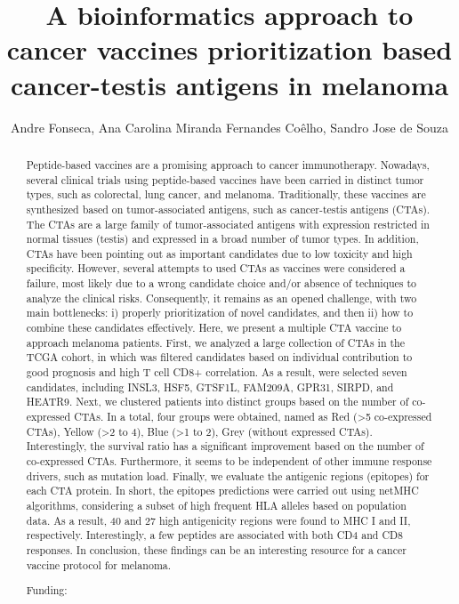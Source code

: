 \documentclass[twoside]{article}
\title{\vspace{-15mm}\fontsize{24pt}{10pt}\selectfont\textbf{ A bioinformatics approach to cancer vaccines prioritization based cancer-testis antigens in melanoma }} %
\author{ Andre Fonseca, Ana Carolina Miranda Fernandes Co\^elho, Sandro Jose de Souza }
\affil{ USP }
\date{}
\begin{document}
  
  
  \maketitle %
  
  
  \thispagestyle{fancy} %
  
  
  \begin{abstract}
  Peptide-based vaccines are a promising approach to cancer immunotherapy. Nowadays,  several clinical trials using peptide-based vaccines have been carried in distinct tumor types,  such as colorectal,  lung cancer,  and melanoma. Traditionally,  these vaccines are synthesized based on tumor-associated antigens,  such as cancer-testis antigens (CTAs). The CTAs are a large family of tumor-associated antigens with expression restricted in normal tissues (testis) and expressed in a broad number of tumor types. In addition,  CTAs have been pointing out as important candidates due to low toxicity and high specificity. However,  several attempts to used CTAs as vaccines were considered a failure,  most likely due to a wrong candidate choice and/or absence of techniques to analyze the clinical risks. Consequently,  it remains as an opened challenge,  with two main bottlenecks: i) properly prioritization of novel candidates,  and then ii) how to combine these candidates effectively. Here,  we present a multiple CTA vaccine to approach melanoma patients. First,  we analyzed a large collection of CTAs in the TCGA cohort,  in which was filtered candidates based on individual contribution to good prognosis and high T cell CD8+ correlation. As a result,  were selected seven candidates,  including INSL3,  HSF5,  GTSF1L,  FAM209A,  GPR31,  SIRPD,  and HEATR9. Next,  we clustered patients into distinct groups based on the number of co-expressed CTAs. In a total,  four groups were obtained,  named as Red (>5 co-expressed CTAs),   Yellow (>2 to 4),  Blue (>1 to 2),  Grey (without expressed CTAs). Interestingly,  the survival ratio has a significant improvement based on the number of co-expressed CTAs. Furthermore,  it seems to be independent of other immune response drivers,  such as mutation load. Finally,  we evaluate the antigenic regions (epitopes) for each CTA protein. In short,  the epitopes predictions were carried out using netMHC algorithms,  considering a subset of high frequent HLA alleles based on population data. As a result,  40 and 27 high antigenicity regions were found to MHC I and II,  respectively. Interestingly,  a few peptides are associated with both CD4 and CD8 responses. In conclusion,  these findings can be an interesting resource for a cancer vaccine protocol for melanoma.
  
  Funding:  \\ 
  \end{abstract}
  
\end{document}
